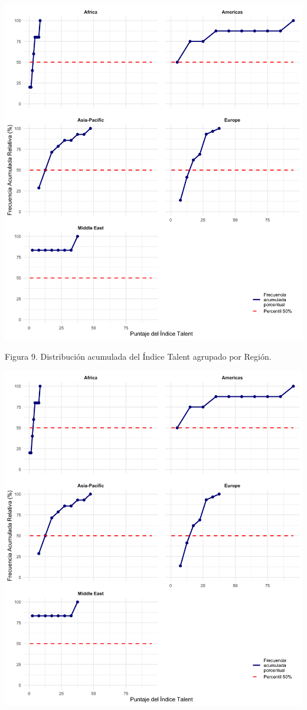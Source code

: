 \documentclass[
]{article}
\begin{document}
\begin{multicols}{2}
\begin{center}
\includegraphics[width=\linewidth]{figura9.png}
\end{center}
Figura 9. Distribución acumulada del Índice Talent agrupado por Región.




\begin{center}
\includegraphics[width=\linewidth]{figura9.png}
\end{center}


\end{multicols}
\end{document}
